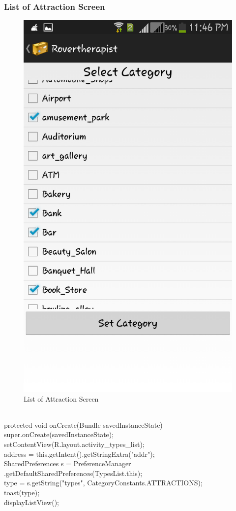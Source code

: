 \documentclass[12pt,a4paper]{article}
\begin{document}
\subsubsection{List of Attraction Screen}
\begin{figure}[!htb]
\centering
\includegraphics[width=12 cm]{attraction}
\caption{List of Attraction Screen}
\end{figure}
\\
\hspace{0.7 cm}protected void onCreate(Bundle savedInstanceState) {\\
		super.onCreate(savedInstanceState);\\
		setContentView(R.layout.activity_types_list);\\
		address = this.getIntent().getStringExtra("addr");\\
		SharedPreferences s = PreferenceManager
				.getDefaultSharedPreferences(TypesList.this);\\
		type = s.getString("types", CategoryConstants.ATTRACTIONS);\\
		toast(type);\\
		displayListView();\\
	}\\
\end{document}
